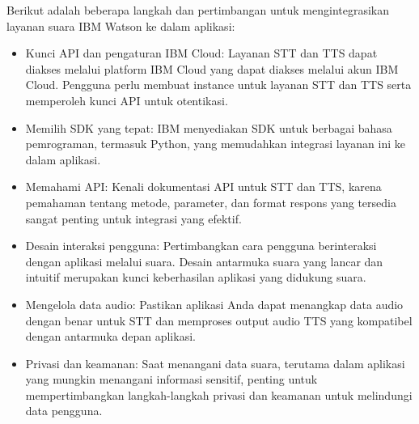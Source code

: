 \documentclass{article}
\begin{document}
Berikut adalah beberapa langkah dan pertimbangan untuk mengintegrasikan layanan suara IBM Watson ke dalam aplikasi:
\begin{itemize}
    \item Kunci API dan pengaturan IBM Cloud: Layanan STT dan TTS dapat diakses melalui platform IBM Cloud yang dapat diakses melalui akun IBM Cloud. Pengguna perlu membuat instance untuk layanan STT dan TTS serta memperoleh kunci API untuk otentikasi.
    \item Memilih SDK yang tepat: IBM menyediakan SDK untuk berbagai bahasa pemrograman, termasuk Python, yang memudahkan integrasi layanan ini ke dalam aplikasi.
    \item Memahami API: Kenali dokumentasi API untuk STT dan TTS, karena pemahaman tentang metode, parameter, dan format respons yang tersedia sangat penting untuk integrasi yang efektif.
    \item Desain interaksi pengguna: Pertimbangkan cara pengguna berinteraksi dengan aplikasi melalui suara. Desain antarmuka suara yang lancar dan intuitif merupakan kunci keberhasilan aplikasi yang didukung suara.
    \item Mengelola data audio: Pastikan aplikasi Anda dapat menangkap data audio dengan benar untuk STT dan memproses output audio TTS yang kompatibel dengan antarmuka depan aplikasi.
    \item Privasi dan keamanan: Saat menangani data suara, terutama dalam aplikasi yang mungkin menangani informasi sensitif, penting untuk mempertimbangkan langkah-langkah privasi dan keamanan untuk melindungi data pengguna.
\end{itemize}
\end{document}
